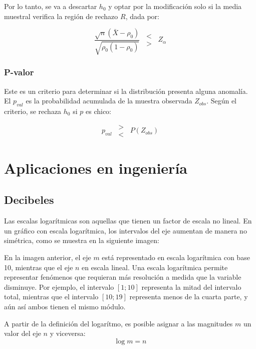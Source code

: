 \documentclass[a5paper,12pt,twoside]{book}
\begin{document}
Por lo tanto, se va a descartar $h_0$ y optar por la modificación solo si la media muestral verifica la región de rechazo $R$, dada por:

$$ \dfrac{\sqrt{n}(\bar{X}-\rho_0)}{\sqrt{\rho_0(1-\rho_0)}} \enspace \substack{< \\ >} \enspace Z_\alpha $$

\subsection{P-valor}

Este es un criterio para determinar si la distribución presenta alguna anomalía. El $p_{val}$ es la probabilidad acumulada de la muestra observada $Z_{obs}$. Según el criterio, se rechaza $h_0$ si $p$ es chico:

\begin{equation}
p_{val} \enspace \substack{> \\ <} \enspace P(Z_{obs})
\end{equation}


\appendix


\chapter{Aplicaciones en ingeniería}


\section{Decibeles}

Las escalas logarítmicas son aquellas que tienen un factor de escala no lineal. En un gráfico con escala logarítmica, los intervalos del eje aumentan de manera no simétrica, como se muestra en la siguiente imagen:

\begin{center}
\end{center}

En la imagen anterior, el eje $m$ está representado en escala logarítmica con base 10, mientras que el eje $n$ en escala lineal. Una escala logarítmica permite representar fenómenos que requieran más resolución a medida que la variable disminuye. Por ejemplo, el intervalo $[1;10]$ representa la mitad del intervalo total, mientras que el intervalo $[10;19]$ representa menos de la cuarta parte, y aún así ambos tienen el mismo módulo.

A partir de la definición del logarítmo, es posible asignar a las magnitudes $m$ un valor del eje $n$ y viceversa:
\begin{equation*}
    \log{m}=n
\end{equation*}
\end{document}
